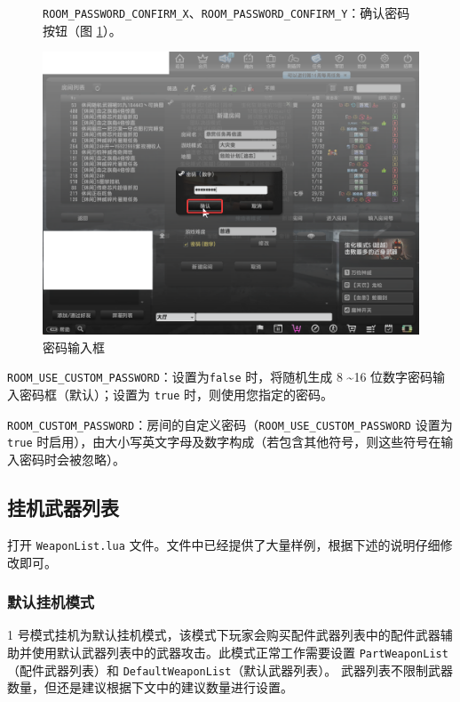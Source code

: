 \begin{figure}[H]
    \Centering
    \parbox[l]{\textwidth}{\lstinline{ROOM_PASSWORD_CONFIRM_X}、\lstinline{ROOM_PASSWORD_CONFIRM_Y}：确认密码按钮（图 \ref{ch2fig-confirm-password}）。}
    \includegraphics[width=\textwidth]{docs/assets/confirm_password.png}
    \caption{密码输入框}
    \label{ch2fig-confirm-password}
\end{figure}

\lstinline{ROOM_USE_CUSTOM_PASSWORD}：设置为\lstinline{false} 时，将随机生成 8 \textasciitilde 16 位数字密码输入密码框（默认）；设置为 \lstinline{true} 时，则使用您指定的密码。

\lstinline{ROOM_CUSTOM_PASSWORD}：房间的自定义密码（\lstinline{ROOM_USE_CUSTOM_PASSWORD} 设置为 \lstinline{true} 时启用），由大小写英文字母及数字构成（若包含其他符号，则这些符号在输入密码时会被忽略）。

\subsection{挂机武器列表}

打开 \lstinline{WeaponList.lua} 文件。文件中已经提供了大量样例，根据下述的说明仔细修改即可。

\subsubsection{默认挂机模式}

1 号模式挂机为默认挂机模式，该模式下玩家会购买配件武器列表中的配件武器辅助并使用默认武器列表中的武器攻击。此模式正常工作需要设置 \lstinline{PartWeaponList}（配件武器列表）和 \lstinline{DefaultWeaponList}（默认武器列表）。
武器列表不限制武器数量，但还是建议根据下文中的建议数量进行设置。

